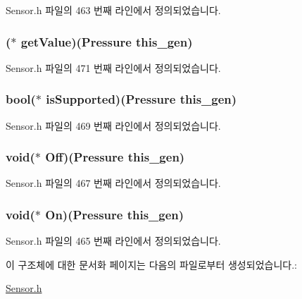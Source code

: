 Sensor.\-h 파일의 463 번째 라인에서 정의되었습니다.

\hypertarget{struct___pressure_a9739a7d1b596639f720e0fbb2dd8f064}{
\subsubsection[{get\-Value}]{($\ast$  get\-Value)({\bf Pressure} this\-\_\-gen)}}\label{struct___pressure_a9739a7d1b596639f720e0fbb2dd8f064}


Sensor.\-h 파일의 471 번째 라인에서 정의되었습니다.

\hypertarget{struct___pressure_af2099f6f9efc1f7213acfd420ea7b8c6}{
\subsubsection[{is\-Supported}]{\setlength{\rightskip}{0pt plus 5cm}bool($\ast$  is\-Supported)({\bf Pressure} this\-\_\-gen)}}\label{struct___pressure_af2099f6f9efc1f7213acfd420ea7b8c6}


Sensor.\-h 파일의 469 번째 라인에서 정의되었습니다.

\hypertarget{struct___pressure_adf5840cfc7760f9f71bcbffceef22fa5}{
\subsubsection[{Off}]{\setlength{\rightskip}{0pt plus 5cm}void($\ast$  Off)({\bf Pressure} this\-\_\-gen)}}\label{struct___pressure_adf5840cfc7760f9f71bcbffceef22fa5}


Sensor.\-h 파일의 467 번째 라인에서 정의되었습니다.

\hypertarget{struct___pressure_a0488fe48cd57a659686387d613cb257c}{
\subsubsection[{On}]{\setlength{\rightskip}{0pt plus 5cm}void($\ast$  On)({\bf Pressure} this\-\_\-gen)}}\label{struct___pressure_a0488fe48cd57a659686387d613cb257c}


Sensor.\-h 파일의 465 번째 라인에서 정의되었습니다.



이 구조체에 대한 문서화 페이지는 다음의 파일로부터 생성되었습니다.\-:\begin{DoxyCompactItemize}
\item 
\hyperlink{_sensor_8h}{Sensor.\-h}\end{DoxyCompactItemize}

